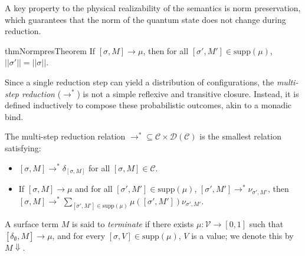 A key property to the physical realizability of the semantics is norm preservation, which guarantees that the norm of the quantum state does not change during reduction.
\begin{restatable}{thm}{NormpresTheorem} \label{thm:norm-pres}
  If $[\sigma,M] \longrightarrow \mu$, then for all $[\sigma',M']\in\mathrm{supp}(\mu)$, $||\sigma'|| = ||\sigma||$.
\end{restatable}

Since a single reduction step can yield a distribution of configurations, the \textit{multi-step reduction} ($\longrightarrow^*$) is not a simple reflexive and transitive closure. Instead, it is defined inductively to compose these probabilistic outcomes, akin to a monadic bind.
\begin{dfn}
  The multi-step reduction relation $\longrightarrow^*\subseteq \mathcal{C}\times \mathcal{D}(\mathcal{C})$ is the smallest relation satisfying:
  \begin{itemize}
    \item $[\sigma,M] \longrightarrow^*\delta_{[\sigma,M]}$ for all $[\sigma,M]\in\mathcal{C}$.
    \item If $[\sigma,M] \longrightarrow \mu$ and for all $[\sigma',M']\in\mathrm{supp}(\mu)$, $[\sigma',M'] \longrightarrow^*\nu_{\sigma',M'}$, then $[\sigma,M] \longrightarrow^*\sum_{[\sigma',M']\in\mathrm{supp}(\mu)} \mu([\sigma',M'])\nu_{\sigma',M'}$.
  \end{itemize}
\end{dfn}

\begin{dfn}[Termination]
  A surface term $M$ is said to \emph{terminate} if there exists $\mu : \mathcal{V} \to [0,1]$ such that $[\delta_\emptyset, M] \longrightarrow\mu$, and for every $[\sigma, V] \in \mathrm{supp}(\mu)$, $V$ is a value; we denote this by $M \Downarrow$.
\end{dfn}

